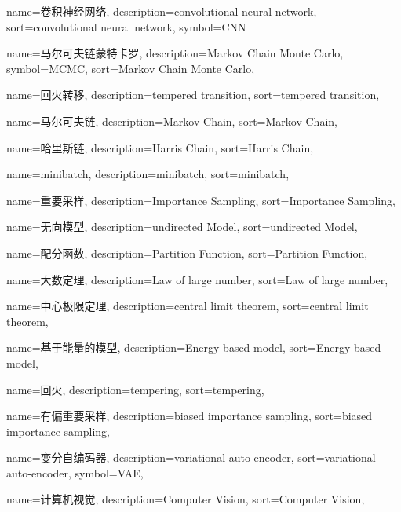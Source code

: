 {
  name=卷积神经网络,
  description={convolutional neural network},
  sort={convolutional neural network},
  symbol={CNN}
}

{
  name=马尔可夫链蒙特卡罗,
  description={Markov Chain Monte Carlo},
  symbol={MCMC},
  sort={Markov Chain Monte Carlo},
}

{
  name=回火转移,
  description={tempered transition},
  sort={tempered transition},
}

{
  name=马尔可夫链,
  description={Markov Chain},
  sort={Markov Chain},
}

{
  name=哈里斯链,
  description={Harris Chain},
  sort={Harris Chain},
}

{
  name=minibatch,
  description={minibatch},
  sort={minibatch},
}

{
  name=重要采样,
  description={Importance Sampling},
  sort={Importance Sampling},
}

{
  name=无向模型,
  description={undirected Model},
  sort={undirected Model},
}

{
  name=配分函数,
  description={Partition Function},
  sort={Partition Function},
}

{
  name=大数定理,
  description={Law of large number},
  sort={Law of large number},
}

{
  name=中心极限定理,
  description={central limit theorem},
  sort={central limit theorem},
}

{
  name=基于能量的模型,
  description={Energy-based model},
  sort={Energy-based model},
}

{
  name=回火,
  description={tempering},
  sort={tempering},
}

{
  name=有偏重要采样,
  description={biased importance sampling},
  sort={biased importance sampling},
}

{
  name=变分自编码器,
  description={variational auto-encoder},
  sort={variational auto-encoder},
  symbol={VAE},
}

{
  name=计算机视觉,
  description={Computer Vision},
  sort={Computer Vision},
}


